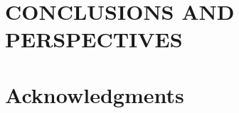 \documentclass[twoside,a4paper,12pt,english]{inac17}
\begin{document}

\section{CONCLUSIONS AND PERSPECTIVES}







\section*{Acknowledgments}

\end{document}
